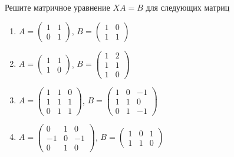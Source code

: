 \begin{exercise}
Решите матричное уравнение \(XA=B\) для следующих матриц
\begin{enumerate}
	\item \(A=\begin{pmatrix}
		1 & 1 \\ 0 & 1
	\end{pmatrix}\), \(B=\begin{pmatrix}
		1 & 0 \\ 1 & 1
	\end{pmatrix}\)
	\item \(A=\begin{pmatrix}
		1 & 1 \\ 1 & 0
	\end{pmatrix}\), \(B=\begin{pmatrix}
		1 & 2 \\ 1 & 1 \\ 1 & 0
	\end{pmatrix}\)
	\item \(A=\begin{pmatrix}
		1 & 1 & 0 \\ 1 & 1 & 1 \\ 0 & 1 & 1
	\end{pmatrix}\), \(B=\begin{pmatrix}
		1 & 0 & -1 \\ 1 & 1 & 0\\ 0 & 1 & -1
	\end{pmatrix}\)
	\item \(A=\begin{pmatrix}
		0 & 1 & 0 \\ -1 & 0 & -1 \\ 0 & 1 & 0
	\end{pmatrix}\), \(B=\begin{pmatrix}
		1 & 0 & 1 \\ 1 & 1 & 0
	\end{pmatrix}\)
\end{enumerate}
\end{exercise}

